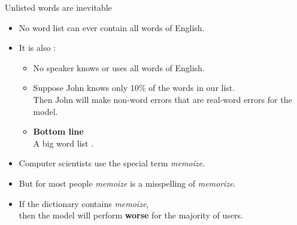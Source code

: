 \documentclass[professionalfonts, xcolor={usenames,svgnames,x11names,table}]{beamer}
\begin{document}
\begin{frame}{Unlisted words are inevitable}
    \begin{itemize}
        \item No word list can ever contain all words of English.
        \item It is also :
            \begin{itemize}
                \item No speaker knows or uses all words of English.
                \item Suppose John knows only 10\% of the words in our list.\\
                      Then John will make non-word errors that are real-word errors for the model.
                \item \textbf{Bottom line}\\
                      A big word list . 
            \end{itemize}
    \end{itemize}
    \pause
    \begin{example}
        \begin{itemize}
            \item Computer scientists use the special term \emph{memoize}.
            \item But for most people \emph{memoize} is a misspelling of \emph{memorize}.
            \item If the dictionary contains \emph{memoize},\\
                then the model will perform \textbf{worse}
                for the majority of users.
        \end{itemize}
    \end{example}
\end{frame}
\end{document}
